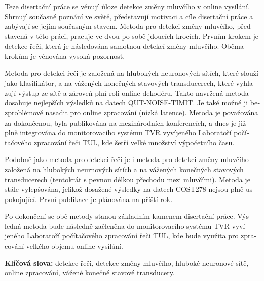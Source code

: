 \documentclass[FM,noheader,EN,bwtitles]{tulthesis}
\begin{document}
\clearpage

\begin{abstractCZ}
\begin{czech}
Teze disertační práce se věnují úloze detekce změny mluvčího v online vysílání.
Shrnují současné poznání ve světě, představují motivaci a cíle disertační práce a zabývají se jejím současným stavem.
Metoda pro detekci změny mluvčího, představená v této práci, pracuje ve dvou po sobě jdoucích krocích.
Prvním krokem je detekce řeči, která je následována samotnou detekcí změny mluvčího.
Oběma krokům je věnována vysoká pozornost.

Metoda pro detekci řeči je založená na hlubokých neuronových sítích, které slouží jako klasifikátor, a na vážených konečných stavových transducerech, které vyhlazují výstup ze sítě a zároveň plní roli online dekodéru.
Takto navržená metoda dosahuje nejlepších výsledků na datech QUT-NOISE-TIMIT. 
Je také možné ji bezproblémově nasadit pro online zpracování (nízká latence).
Metoda je považována za dokončenou, byla publikována na mezinárodních konferencích, a dnes je již plně integrována do monitorovacího systému TVR vyvíjeného Laboratoří počítačového zpracování řeči TUL, kde šetří velké množství výpočetního času.


Podobně jako metoda pro detekci řeči je i metoda pro detekci změny mluvčího založená na hlubokých neurnových sítích a na vážených konečných stavových transducerech (tentokrát s pevnou délkou přechodu mezi mluvčími).
Metoda je stále vylepšována, jelikož dosažené výsledky na datech COST278 nejsou plně uspokojující.
První publikace je plánována na příští rok.

Po dokončení se obě metody stanou základním kamenem disertační práce.
Výsledná metoda bude následně začleněna do monitorovacího systému TVR vyvíjeného Laboratoří počítačového zpracování řeči TUL, kde bude využita pro zpracování velkého objemu online vysílání.

\vspace{0.5cm}
\noindent\textbf{Klíčová slova:}
detekce řeči, detekce změny mluvčího, hluboké neuronové sítě, online zpracování, vážené konečné stavové transducery.
\end{czech}
\end{abstractCZ}
\clearpage

\TULfooter
\tableofcontents
\clearpage
\listoffigures

\begingroup
\let\clearpage\relax
\vspace{1.6cm}
\end{document}
